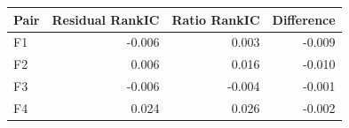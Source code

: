 \begin{tabular}{lrrr}
\toprule
Pair & Residual RankIC & Ratio RankIC & Difference \\
\midrule
F1 & -0.006 & 0.003 & -0.009 \\
F2 & 0.006 & 0.016 & -0.010 \\
F3 & -0.006 & -0.004 & -0.001 \\
F4 & 0.024 & 0.026 & -0.002 \\
\bottomrule
\end{tabular}
